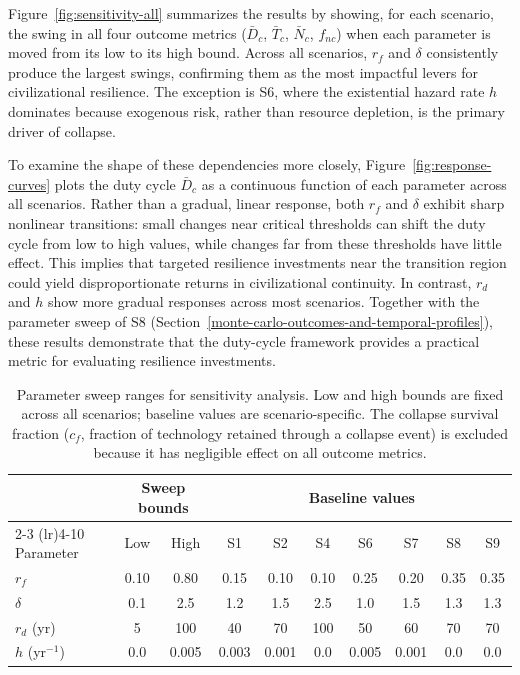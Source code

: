 Figure~\ref{fig:sensitivity-all} summarizes the results by showing, for each scenario, the swing in all four outcome metrics ($\bar{D}_c$, $\bar{T}_c$, $\bar{N}_c$, $f_{nc}$) when each parameter is moved from its low to its high bound. Across all scenarios, $r_f$ and $\delta$ consistently produce the largest swings, confirming them as the most impactful levers for civilizational resilience. The exception is S6, where the existential hazard rate $h$ dominates because exogenous risk, rather than resource depletion, is the primary driver of collapse.

To examine the shape of these dependencies more closely, Figure~\ref{fig:response-curves} plots the duty cycle $\bar{D}_c$ as a continuous function of each parameter across all scenarios. Rather than a gradual, linear response, both $r_f$ and $\delta$ exhibit sharp nonlinear transitions: small changes near critical thresholds can shift the duty cycle from low to high values, while changes far from these thresholds have little effect. This implies that targeted resilience investments near the transition region could yield disproportionate returns in civilizational continuity. In contrast, $r_d$ and $h$ show more gradual responses across most scenarios. Together with the parameter sweep of S8 (Section~\ref{monte-carlo-outcomes-and-temporal-profiles}), these results demonstrate that the duty-cycle framework provides a practical metric for evaluating resilience investments.

\begin{table}[htbp]
\centering
\caption{Parameter sweep ranges for sensitivity analysis. Low and high bounds are fixed across all scenarios; baseline values are scenario-specific. The collapse survival fraction ($c_f$, fraction of technology retained through a collapse event) is excluded because it has negligible effect on all outcome metrics.}
\label{tab:sweep-ranges}
\begin{tabular}{l c c c c c c c c c}
\toprule
 & \multicolumn{2}{c}{Sweep bounds} & \multicolumn{7}{c}{Baseline values} \\
\cmidrule(lr){2-3} \cmidrule(lr){4-10}
Parameter & Low & High & S1 & S2 & S4 & S6 & S7 & S8 & S9 \\
\midrule
$r_f$            & 0.10  & 0.80  & 0.15 & 0.10 & 0.10 & 0.25 & 0.20 & 0.35 & 0.35 \\
$\delta$         & 0.1   & 2.5   & 1.2  & 1.5  & 2.5  & 1.0  & 1.5  & 1.3  & 1.3  \\
$r_d$ (yr)       & 5     & 100   & 40   & 70   & 100  & 50   & 60   & 70   & 70   \\
$h$ (yr$^{-1}$)  & 0.0   & 0.005 & 0.003 & 0.001 & 0.0 & 0.005 & 0.001 & 0.0 & 0.0 \\
\bottomrule
\end{tabular}
\end{table}

